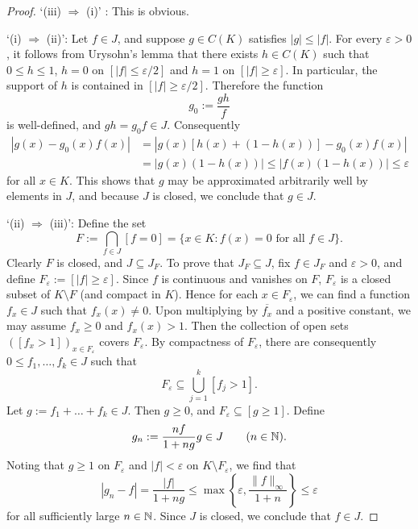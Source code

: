 \begin{proof}
	`(iii) $\Rightarrow$ (i)' :  This is obvious.
	
	`(i) $\Rightarrow$ (ii)': Let $f\in J$, and suppose $g \in C(K)$ satisfies $|g| \le |f|$. For every $\varepsilon >0$, it follows from Urysohn's lemma that there exists $h \in C(K)$ such that $0 \le h \le 1$, $h=0$ on $[|f| \le \varepsilon/2]$ and $h=1$ on $[|f| \ge \varepsilon]$. In particular, the support of $h$ is contained in $[|f| \ge \varepsilon/2]$. Therefore the function
	\begin{equation*}
		g_0 := \frac{gh}{f}
	\end{equation*}
	is well-defined, and $gh = g_0f \in J$. Consequently
	\begin{align*}
		|g(x)-g_0(x) f(x)| &= |g(x)[h(x)+(1-h(x))]-g_0(x) f(x)| \\
		&= |g(x)(1-h(x))| \le |f(x)(1-h(x))| \le \varepsilon
	\end{align*}
	for all $x\in K$. This shows that $g$ may be approximated arbitrarily well by elements in $J$, and because $J$ is closed, we conclude that $g\in J$.
	
	`(ii) $\Rightarrow$ (iii)': Define the set
	\begin{equation*}
		F := \bigcap_{f\in J} [f=0] = \{x\in K : f(x)=0 \text{ for all } f\in J\}.
	\end{equation*}
	Clearly $F$ is closed, and $J \subseteq J_F$. To prove that $J_F \subseteq J$, fix $f\in J_F$ and $\varepsilon >0$, and define $F_\varepsilon := [|f| \ge \varepsilon]$. Since $f$ is continuous and vanishes on $F$, $F_\varepsilon$ is a closed subset of $K \setminus F$ (and compact in $K$). Hence for each $x\in F_\varepsilon$, we can find a function $f_x \in J$ such that $f_x(x) \ne 0$. Upon multiplying by $\overline{f_x}$ and a positive constant, we may assume $f_x \ge 0$ and $f_x(x)>1$. Then the collection of open sets $([f_x > 1])_{x\in F_\varepsilon}$ covers $F_\varepsilon$. By compactness of $F_\varepsilon$, there are consequently $0 \le f_1, \ldots, f_k \in J$ such that
	\begin{equation*}
		F_\varepsilon \subseteq \bigcup_{j=1}^k [f_j > 1].
	\end{equation*}
	Let $g := f_1+\ldots +f_k \in J$. Then $g \ge 0$, and $F_\varepsilon \subseteq [g \ge 1]$. Define
	\begin{equation*}
		g_n := \frac{nf}{1+ng}g \in J \qquad (n\in\mathbb{N}).
	\end{equation*}
	Noting that $g \ge 1$ on $F_\varepsilon$ and $|f|<\varepsilon$ on $K \setminus F_\varepsilon$, we find that
	\begin{equation*}
		|g_n - f| = \frac{|f|}{1+ng} \le \max\left\{ \varepsilon, \frac{\|f\|_\infty}{1+n} \right\} \le \varepsilon
	\end{equation*}
	for all sufficiently large $n\in\mathbb{N}$. Since $J$ is closed, we conclude that $f\in J$.
\end{proof}

